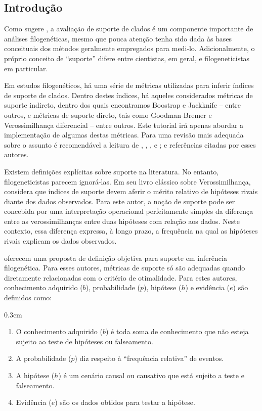 \begin{refsection}
\section{Introdução}\label{tut14:intro}

Como sugere \textcite[][]{GrantKluge2008b}, a avaliação de suporte de clados é um componente importante de análises filogenéticas, mesmo que pouca atenção tenha sido dada às bases conceituais dos métodos geralmente empregados para medi-lo. Adicionalmente, o próprio conceito de ``suporte'' difere entre cientistas, em geral, e filogeneticistas em particular. 

Em estudos filogenéticos, há uma série de métricas utilizadas para inferir índices de suporte de clados. Dentro destes índices, há aqueles considerados métricas de suporte indireto, dentro dos quais encontramos Boostrap e Jackknife -- entre outros, e métricas de suporte direto, tais como Goodman-Bremer e Verossimilhança diferencial -- entre outros. Este tutorial irá apenas abordar a implementação de algumas destas métricas. Para uma revisão mais adequada sobre o assunto é recomendável a leitura de \textcite{Siddall_2001}, \textcite{Egan_2006}, \textcite{GrantKluge2008b}, \textcite{Wheeler_2012} e \textcite{machado_et_al_2022}; e referências citadas por esses autores. 

Existem definições explícitas sobre suporte na literatura. No entanto, filogeneticistas parecem ignorá-las. Em seu livro clássico sobre Verossimilhança, \textcite{Edwards_1992} considera que índices de suporte devem aferir o mérito relativo de hipóteses rivais diante dos dados observados. Para este autor, a noção de suporte pode ser concebida por uma interpretação operacional perfeitamente simples da diferença entre as verossimilhanças entre duas hipóteses com relação aos dados. Neste contexto, essa diferença expressa, à longo prazo, a frequência na qual as hipóteses rivais explicam os dados observados.

\textcite{GrantKluge2008b} oferecem uma proposta de definição objetiva para suporte em inferência filogenética. Para esses autores, métricas de suporte só são adequadas quando diretamente relacionadas com o critério de otimalidade. Para estes autores, conhecimento adquirido ($b$), probabilidade ($p$), hipótese ($h$) e evidência ($e$) são definidos como:

\begin {myindentpar}{0.3cm}
\begin{enumerate}[1.]
\item O conhecimento adquirido ($b$) é toda soma de conhecimento que não esteja sujeito ao teste de hipóteses ou falseamento.
\item A probabilidade ($p$) diz respeito à ``frequência relativa'' de eventos.
\item A hipótese ($h$) é um cenário causal ou causativo que está sujeito a teste e falseamento.
\item Evidência ($e$) são os dados obtidos para testar a hipótese.
\end{enumerate}
\end{myindentpar}


\end{refsection}

